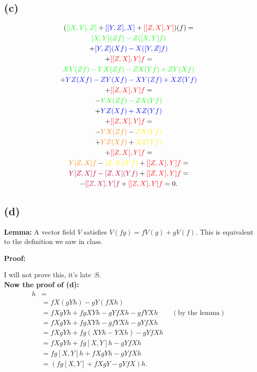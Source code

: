 \documentclass{article}
\begin{document}
\subsection*{(c)}
\begin{multline*}
(\textcolor{green}{[[X,Y],Z]} +\textcolor{blue}{[[Y,Z],X]} +\textcolor{red}{[[Z,X],Y]})(f)=\\
	\textcolor{green}{[X,Y](Zf)-Z([X,Y]f)}\\
	+\textcolor{blue}{[Y,Z](Xf)-X([Y,Z]f)}\\
	+\textcolor{red}{[[Z,X],Y]f}=\\
\textcolor{green}{XY(Zf)-YX(Zf)-ZX(Yf)+ZY(Xf)}\\
+\textcolor{blue}{YZ(Xf)-ZY(Xf)-XY(Zf)+XZ(Yf)}\\
+\textcolor{red}{[[Z,X],Y]f}=\\
-\textcolor{green}{YX(Zf)-ZX(Yf)}\\
+\textcolor{blue}{YZ(Xf)+XZ(Yf)}\\
+\textcolor{red}{[[Z,X],Y]f}=\\
-\textcolor{orange}{YX(Zf)}-\textcolor{yellow}{ZX(Yf)}\\
+\textcolor{orange}{YZ(Xf)}+\textcolor{yellow}{XZ(Yf)}\\
+\textcolor{red}{[[Z,X],Y]f}=\\
\textcolor{orange}{Y[Z,X]f}-\textcolor{yellow}{[Z,X](Yf)}+\textcolor{red}{[[Z,X],Y]f}=\\
\textcolor{purple}{Y[Z,X]f-[Z,X](Yf)}+\textcolor{red}{[[Z,X],Y]f}=\\
-\textcolor{purple}{[[Z,X],Y]f}+\textcolor{red}{[[Z,X],Y]f}=0.
\end{multline*}

\subsection*{(d)}
\textbf{Lemma:} A vector field $V$ satisfies $V(fg)=fV(g)+gV(f)$. This is equivalent to the definition we saw in class.

\textbf{Proof:}

I will not prove this, it's late :S.\\
\textbf{Now the proof of (d):}
\begin{align*}
[fX,gY]h
&=\\
&=fX(gYh)-gY(fXh)\\
&=fXgYh+fgXYh-gYfXh-gfYXh\qquad(\text{by the lemma})\\
&=fXgYh+fgXYh-gfYXh-gYfXh\\
&=fXgYh+fg(XYh-YXh)-gYfXh\\
&=fXgYh+fg[X,Y]h-gYfXh\\
&=fg[X,Y]h+fXgYh-gYfXh\\
&=(fg[X,Y]+fXgY-gYfX)h.
\end{align*}
\end{document}

